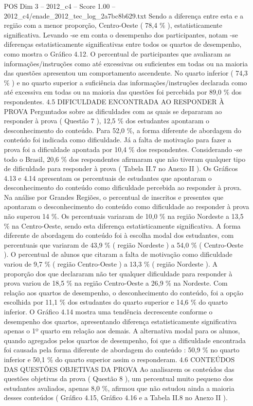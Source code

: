 \begin{textsample}{POS Dim 3 – 2012\_c4 – Score 1.00 – 2012\_c4/enade\_2012\_tec\_log\_2a7bc8b629.txt}
Sendo a diferença entre esta e a região com a menor proporção, Centro-Oeste ( 78,4 \% ), estatisticamente significativa.
Levando -se em conta o desempenho dos participantes, notam -se diferenças estatisticamente significativas entre todos os quartos de desempenho, como mostra o Gráfico 4.12.
O percentual de participantes que avaliaram as informações/instruções como até excessivas ou suficientes em todas ou na maioria das questões apresentou um comportamento ascendente.
No quarto inferior ( 74,3 \% ) e no quarto superior a suficiência das informações/instruções declarada como até excessiva em todas ou na maioria das questões foi percebida por 89,0 \% dos respondentes. 4.5 DIFICULDADE ENCONTRADA AO RESPONDER À PROVA Perguntados sobre as dificuldades com as quais se depararam ao responder à prova ( Questão 7 ), 12,5 \% dos estudantes apontaram o desconhecimento do conteúdo.
Para 52,0 \%, a forma diferente de abordagem do conteúdo foi indicada como dificuldade.
Já a falta de motivação para fazer a prova foi a dificuldade apontada por 10,4 \% dos respondentes.
Considerando -se todo o Brasil, 20,6 \% dos respondentes afirmaram que não tiveram qualquer tipo de dificuldade para responder à prova ( Tabela II.7 no Anexo II ).
Os Gráficos 4.13 e 4.14 apresentam os percentuais de estudantes que apontaram o desconhecimento do conteúdo como dificuldade percebida ao responder à prova.
Na análise por Grandes Regiões, o percentual de inscritos e presentes que apontaram o desconhecimento do conteúdo como dificuldade ao responder à prova não superou 14 \%.
Os percentuais variaram de 10,0 \% na região Nordeste a 13,5 \% na Centro-Oeste, sendo esta diferença estatisticamente significativa.
A forma diferente de abordagem do conteúdo foi à escolha modal dos estudantes, com percentuais que variaram de 43,9 \% ( região Nordeste ) a 54,0 \% ( Centro-Oeste ).
O percentual de alunos que citaram a falta de motivação como dificuldade variou de 9,7 \% ( região Centro-Oeste ) a 13,3 \% ( região Nordeste ).
A proporção dos que declararam não ter qualquer dificuldade para responder à prova variou de 18,5 \% na região Centro-Oeste a 26,9 \% na Nordeste.
Com relação aos quartos de desempenho, o desconhecimento do conteúdo, foi a opção escolhida por 11,1 \% dos estudantes do quarto superior e 14,6 \% do quarto inferior.
O Gráfico 4.14 mostra uma tendência decrescente conforme o desempenho dos quartos, apresentando diferença estatisticamente significativa apenas o 1º quarto em relação aos demais.
A alternativa modal para os alunos, quando agregados pelos quartos de desempenho, foi que a dificuldade encontrada foi causada pela forma diferente de abordagem do conteúdo : 50,9 \% no quarto inferior e 50,1 \% do quarto superior assim o responderam. 4.6 CONTEÚDOS DAS QUESTÕES OBJETIVAS DA PROVA Ao analisarem os conteúdos das questões objetivas da prova ( Questão 8 ), um percentual muito pequeno dos estudantes avaliados, apenas 8,0 \%, afirmou que não estudou ainda a maioria desses conteúdos ( Gráfico 4.15, Gráfico 4.16 e a Tabela II.8 no Anexo II ).

\end{textsample}
